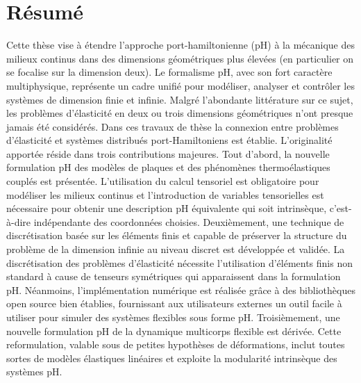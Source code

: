 \chapter*{R\'esum\'e}

Cette thèse vise à étendre l'approche port-hamiltonienne (pH) à la mécanique des milieux continus dans des dimensions géométriques plus élevées (en particulier on se focalise sur la dimension deux). Le formalisme pH, avec son fort caractère multiphysique, représente un cadre unifié pour modéliser, analyser et contrôler les systèmes de dimension finie et infinie. Malgré l'abondante littérature sur ce sujet, les problèmes d'élasticité en deux ou trois dimensions géométriques n'ont presque jamais été considérés. Dans ces travaux de thèse la connexion entre problèmes d'élasticité et systèmes distribués port-Hamiltoniens est établie. L'originalité apportée réside dans trois contributions majeures. Tout d'abord, la nouvelle formulation pH des modèles de plaques et des phénomènes thermoélastiques couplés est présentée. L'utilisation du calcul tensoriel est obligatoire pour modéliser les milieux  continus et l'introduction de variables tensorielles est nécessaire pour obtenir une description pH équivalente qui soit intrinsèque, c'est-à-dire indépendante des coordonnées choisies. Deuxièmement, une technique de discrétisation basée sur les éléments finis et capable de préserver la structure du problème de la dimension infinie au niveau discret est développée et validée. La discrétisation des problèmes d'élasticité nécessite l'utilisation d'éléments finis non standard à cause de tenseurs symétriques qui apparaissent dans la formulation pH. Néanmoins, l'implémentation numérique est réalisée grâce à des bibliothèques open source bien établies, fournissant aux utilisateurs externes un outil facile à utiliser pour simuler des systèmes flexibles sous forme pH. Troisièmement, une nouvelle formulation pH de la dynamique multicorps flexible est dérivée. Cette reformulation, valable sous de petites hypothèses de déformations, inclut toutes sortes de modèles élastiques linéaires et exploite la modularité intrinsèque des systèmes pH.
